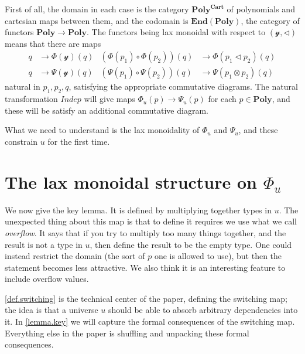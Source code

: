 \documentclass[11pt, one side, article]{memoir}
\theoremstyle{definition}
\theoremstyle{plain}
\newcommand{\Cat}[1]{\mathbf{#1}}%
\newcommand{\Fun}[1]{\mathit{#1}}%
\newcommand{\en}{\Cat{End}}
\newcommand{\yon}{\mathcal{y}}
\newcommand{\poly}{\Cat{Poly}}
\newcommand{\polycart}{\poly^{\Cat{Cart}}}
\newcommand{\0}{\textsf{0}}
\newcommand{\1}{\tn{\textsf{1}}}
\newcommand{\tri}{\mathbin{\triangleleft}}
\newcommand{\indep}{\Fun{Indep}}
\begin{document}
First of all, the domain in each case is the category $\polycart$ of polynomials and cartesian maps between them, and the codomain is $\en(\poly)$, the category of functors $\poly\to\poly$. The functors being lax monoidal with respect to $(\yon,\tri)$ means that there are maps
\begin{align*}
  q&\to\Phi(\yon)(q)
  &(\Phi(p_1)\circ\Phi(p_2))(q)&\to \Phi(p_1\tri p_2)(q)\\
  q&\to\Psi(\yon)(q)
  &(\Psi(p_1)\circ\Psi(p_2))(q)&\to \Psi(p_1\otimes p_2)(q)
\end{align*}
natural in $p_1,p_2,q$, satisfying the appropriate commutative diagrams. The natural transformation $\indep$ will give maps $\Phi_u(p)\to\Psi_u(p)$ for each $p\in\poly$, and these will be satisfy an additional commutative diagram.

What we need to understand is the lax monoidality of $\Phi_u$ and $\Psi_u$, and these constrain $u$ for the first time.

\section{The lax monoidal structure on $\Phi_u$}

We now give the key lemma. It is defined by multiplying together types in $u$. The unexpected thing about this map is that to define it requires we use what we call \emph{overflow}. It says that if you try to multiply too many things together, and the result is not a type in $u$, then define the result to be the empty type. One could instead restrict the domain (the sort of $p$ one is allowed to use), but then the statement becomes less attractive. We also think it is an interesting feature to include overflow values.

\cref{def.switching} is the technical center of the paper, defining the switching map; the idea is that a universe $u$ should be able to absorb arbitrary dependencies into it. In \cref{lemma.key} we will capture the formal consequences of the switching map. Everything else in the paper is shuffling and unpacking these formal consequences. 
\end{document}
